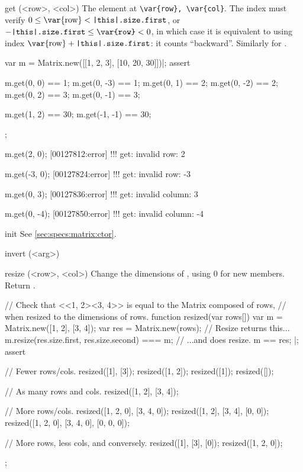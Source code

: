 \begin{urbiscriptapi}
\item[get](<row>, <col>)%
  The element at \lstinline|\var{row}, \var{col}|.  The index  must
  verify $0 \le \textrm{\var{row}} < \texttt{\this.size.first}$, or
  $-\texttt{\this.size.first} \le \texttt{\var{row}} < 0$, in which case it
  is equivalent to using index $\textrm{\var{row}} +
  \texttt{\this.size.first}$: it counts ``backward''.  Similarly for
  .
\begin{urbiscript}
var m = Matrix.new([[1, 2, 3], [10, 20, 30]])|;
assert
{
  m.get(0, 0) == 1;   m.get(0, -3) == 1;
  m.get(0, 1) == 2;   m.get(0, -2) == 2;
  m.get(0, 2) == 3;   m.get(0, -1) == 3;

  m.get(1, 2) == 30;  m.get(-1, -1) == 30;
};

m.get(2, 0);
[00127812:error] !!! get: invalid row: 2

m.get(-3, 0);
[00127824:error] !!! get: invalid row: -3

m.get(0, 3);
[00127836:error] !!! get: invalid column: 3

m.get(0, -4);
[00127850:error] !!! get: invalid column: -4
\end{urbiscript}

\item[init]%
  See \autoref{sec:specs:matrix:ctor}.

\item[invert](<arg>)%
\begin{urbiassert}

\end{urbiassert}

\item[resize](<row>, <col>)%
  Change the dimensions of \this, using 0 for new members.  Return \this.
\begin{urbiscript}
// Check that <<1, 2><3, 4>> is equal to the Matrix composed of rows,
// when resized to the dimensions of rows.
function resized(var rows[])
{
  var m = Matrix.new([1, 2], [3, 4]);
  var res = Matrix.new(rows);
  // Resize returns this...
  m.resize(res.size.first, res.size.second) === m;
  // ...and does resize.
  m == res;
}|;
assert
{
  // Fewer rows/cols.
  resized([1], [3]);
  resized([1, 2]);
  resized([1]);
  resized([]);

  // As many rows and cols.
  resized([1, 2], [3, 4]);

  // More rows/cols.
  resized([1, 2, 0], [3, 4, 0]);
  resized([1, 2], [3, 4], [0, 0]);
  resized([1, 2, 0], [3, 4, 0], [0, 0, 0]);

  // More rows, less cols, and conversely.
  resized([1], [3], [0]);
  resized([1, 2, 0]);
};
\end{urbiscript}


\end{urbiscriptapi}
